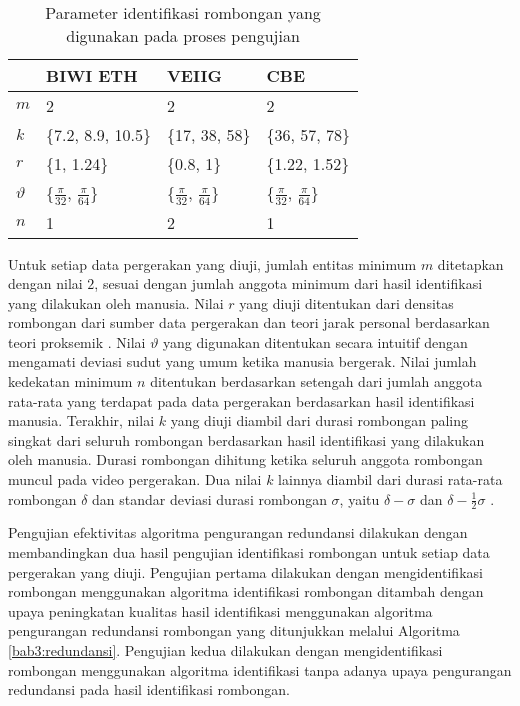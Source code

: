 \begin{table}[h]
    \centering
    \caption[Parameter identifikasi rombongan]{Parameter identifikasi rombongan yang digunakan pada proses pengujian}
    \begin{tabular}{p{1cm} p{2.5cm} p{2.5cm} p{2.5cm}}
        \hline
        & \textbf{BIWI ETH} & \textbf{VEIIG} & \textbf{CBE} \\
        \hline
        $m$ & 2 & 2 & 2 \\
        $k$ & \{7.2, 8.9, 10.5\} & \{17, 38, 58\} & \{36, 57, 78\} \\
        $r$ & \{1, 1.24\} & \{0.8, 1\} & \{1.22, 1.52\} \\
        $\vartheta$ & \{$\frac{\pi}{32}$, $\frac{\pi}{64}$\} & \{$\frac{\pi}{32}$, $\frac{\pi}{64}$\} & \{$\frac{\pi}{32}$, $\frac{\pi}{64}$\} \\
        $n$ & 1 & 2 & 1 \\
        \hline
    \end{tabular}
    
    \label{bab6:parameter}
\end{table}

Untuk setiap data pergerakan yang diuji, jumlah entitas minimum $m$ ditetapkan dengan nilai $2$, sesuai dengan jumlah anggota minimum dari hasil identifikasi yang dilakukan oleh manusia. Nilai $r$ yang diuji ditentukan dari densitas rombongan dari sumber data pergerakan \cite{solera:06:range-reference} dan teori jarak personal berdasarkan teori proksemik \cite{hall:06:proxemic}. Nilai $\vartheta$ yang digunakan ditentukan secara intuitif dengan mengamati deviasi sudut yang umum ketika manusia bergerak. Nilai jumlah kedekatan minimum $n$ ditentukan berdasarkan setengah dari jumlah anggota rata-rata yang terdapat pada data pergerakan berdasarkan hasil identifikasi manusia. Terakhir, nilai $k$ yang diuji diambil dari durasi rombongan paling singkat dari seluruh rombongan berdasarkan hasil identifikasi yang dilakukan oleh manusia. Durasi rombongan dihitung ketika seluruh anggota rombongan muncul pada video pergerakan. Dua nilai $k$ lainnya diambil dari durasi rata-rata rombongan $\delta$ dan standar deviasi durasi rombongan $\sigma$, yaitu $\delta - \sigma$ dan $\delta - \frac{1}{2}\sigma$ \cite{wiratma:software}.

Pengujian efektivitas algoritma pengurangan redundansi dilakukan dengan membandingkan dua hasil pengujian identifikasi rombongan untuk setiap data pergerakan yang diuji. Pengujian pertama dilakukan dengan mengidentifikasi rombongan menggunakan algoritma identifikasi rombongan ditambah dengan upaya peningkatan kualitas hasil identifikasi menggunakan algoritma pengurangan redundansi rombongan yang ditunjukkan melalui Algoritma \ref{bab3:redundansi}. Pengujian kedua dilakukan dengan mengidentifikasi rombongan menggunakan algoritma identifikasi tanpa adanya upaya pengurangan redundansi pada hasil identifikasi rombongan.

